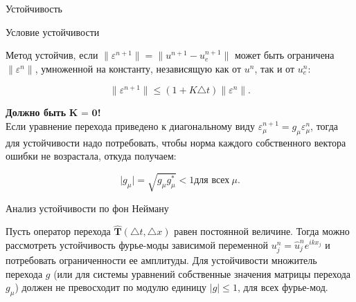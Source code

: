 \documentclass[12pt,xcolor=pst,aspectratio=169]{beamer}
\begin{document}
\begin{frame}{Устойчивость}

	\transdissolve[duration=0.1]
	\justifying
	\large

	\begin{block}{Условие устойчивости}

		Метод устойчив, если $\parallel \varepsilon^{n + 1} \parallel = \parallel u^{n + 1} - u^{n + 1}_{e} \parallel$ может быть ограничена $\parallel \varepsilon^{n} \parallel$, умноженной на константу, независящую как от $u^{n}$, так и от $ u^{n}_{e}$:

		\[
			\parallel \varepsilon^{n + 1} \parallel \leq \left( 1 + K \triangle t \right) \parallel \varepsilon^{n} \parallel.
		\]

	\end{block}

	\textbf{Должно быть} $\textbf{K = 0}$\textbf{!}\\

	Если уравнение перехода приведено к диагональному виду $\varepsilon^{n + 1}_{\mu} = g_{\mu} \varepsilon^{n}_{\mu}$, тогда для устойчивости надо потребовать, чтобы норма каждого собственного вектора ошибки не возрастала, откуда получаем:

	\[
		\vert g_{\mu} \vert = \sqrt{ g_{\mu}  g^{*}_{\mu}} < 1 \mbox{для всех} \: \mu.
	\]

\end{frame}

\begin{frame}{Анализ устойчивости по фон Нейману}

	\transdissolve[duration=0.1]
	\justifying
	\large

	Пусть оператор перехода $\hat{\textbf{T}} (\triangle t, \triangle x)$ равен постоянной величине. Тогда можно рассмотреть устойчивость фурье-моды зависимой переменной $u^{n}_{j} = \hat{u}^{n}_{j} e^{i k x_{j}}$ и потребовать ограниченности ее амплитуды. Для устойчивости множитель перехода $g$ (или для системы уравнений собственные значения матрицы перехода $g_{\mu}$) должен не превосходит по модулю единицу $\vert g \vert \leq 1$, для всех фурье-мод.\\

\end{frame}
\end{document}
